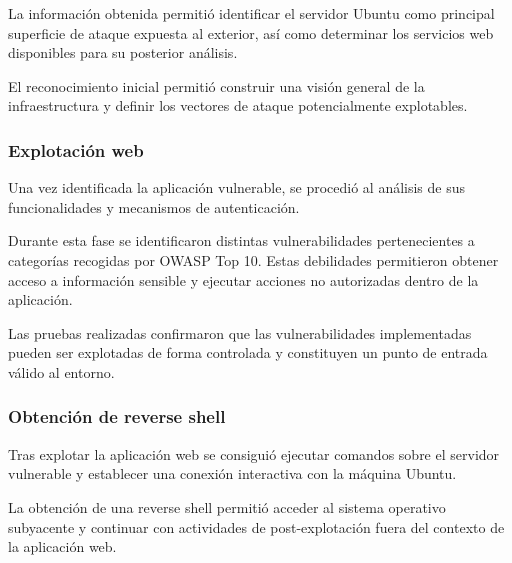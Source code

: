 La información obtenida permitió identificar el servidor Ubuntu como principal superficie de ataque expuesta al exterior, así como determinar los servicios web disponibles para su posterior análisis.


El reconocimiento inicial permitió construir una visión general de la infraestructura y definir los vectores de ataque potencialmente explotables.


\subsubsection{Explotación web}

Una vez identificada la aplicación vulnerable, se procedió al análisis de sus funcionalidades y mecanismos de autenticación.

Durante esta fase se identificaron distintas vulnerabilidades pertenecientes a categorías recogidas por OWASP Top 10. Estas debilidades permitieron obtener acceso a información sensible y ejecutar acciones no autorizadas dentro de la aplicación.

Las pruebas realizadas confirmaron que las vulnerabilidades implementadas pueden ser explotadas de forma controlada y constituyen un punto de entrada válido al entorno.

%


\subsubsection{Obtención de reverse shell}

Tras explotar la aplicación web se consiguió ejecutar comandos sobre el servidor vulnerable y establecer una conexión interactiva con la máquina Ubuntu.

La obtención de una reverse shell permitió acceder al sistema operativo subyacente y continuar con actividades de post-explotación fuera del contexto de la aplicación web.

